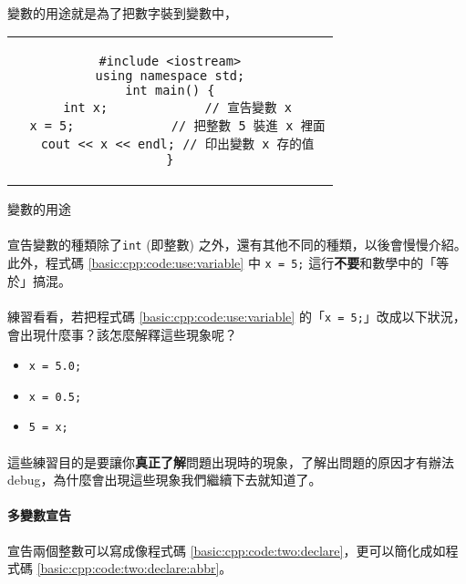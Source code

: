 \documentclass[12pt,a4paper,oneside]{article}
\begin{document}
\begin{CJK}{UTF8}{bkai}
\paragraph{}變數的用途就是為了把數字裝到變數中，
\begin{code}[h!]
\centering
\begin{tabular}{c}
\begin{lstlisting}
#include <iostream>
using namespace std;
int main() {
  int x;             // 宣告變數 x
  x = 5;             // 把整數 5 裝進 x 裡面
  cout << x << endl; // 印出變數 x 存的值
}
\end{lstlisting}
\end{tabular}
\caption{變數的用途}
\label{basic:cpp:code:use:variable}
\end{code}

\paragraph{}宣告變數的種類除了\lstinline!int! (即整數) 之外，還有其他不同的種類，以後會慢慢介紹。此外，程式碼 \ref{basic:cpp:code:use:variable} 中 \lstinline!x = 5;! 這行\textbf{不要}和數學中的「等於」搞混。
  
\paragraph{}練習看看，若把程式碼 \ref{basic:cpp:code:use:variable} 的「\lstinline!x = 5;!」改成以下狀況，會出現什麼事？該怎麼解釋這些現象呢？
\begin{itemize}
\item \lstinline!x = 5.0;!
\item \lstinline!x = 0.5;!
\item \lstinline!5 = x;!
\end{itemize}

\paragraph{}這些練習目的是要讓你\textbf{真正了解}問題出現時的現象，了解出問題的原因才有辦法 debug，為什麼會出現這些現象我們繼續下去就知道了。

\paragraph{多變數宣告}宣告兩個整數可以寫成像程式碼 \ref{basic:cpp:code:two:declare}，更可以簡化成如程式碼 \ref{basic:cpp:code:two:declare:abbr}。


\end{CJK}
\end{document}
